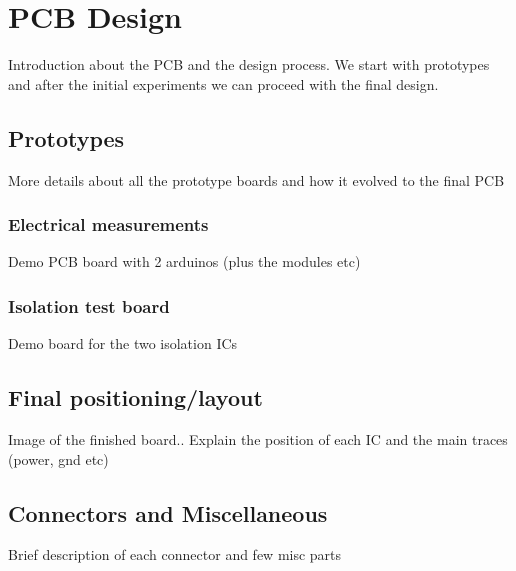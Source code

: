 \section{PCB Design}
Introduction about the PCB and the design process.
We start with prototypes and after the initial experiments we can proceed with the final design.
\subsection{Prototypes}
More details about all the prototype boards and how it evolved to the final PCB
\subsubsection{Electrical measurements}
Demo PCB board with 2 arduinos (plus the modules etc)
\subsubsection{Isolation test board}
Demo board for the two isolation ICs

\subsection{Final positioning/layout}
Image of the finished board..
Explain the position of each IC and the main traces (power, gnd etc)
\subsection{Connectors and Miscellaneous}
Brief description of each connector and few misc parts
